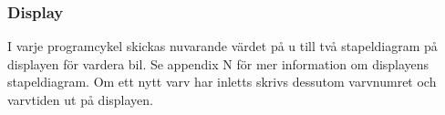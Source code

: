 \subsubsection{Display}

I varje programcykel skickas nuvarande värdet på u till två stapeldiagram på
displayen för vardera bil. Se appendix N för mer information om displayens
stapeldiagram. Om ett nytt varv har inletts skrivs dessutom varvnumret och
varvtiden ut på displayen.
